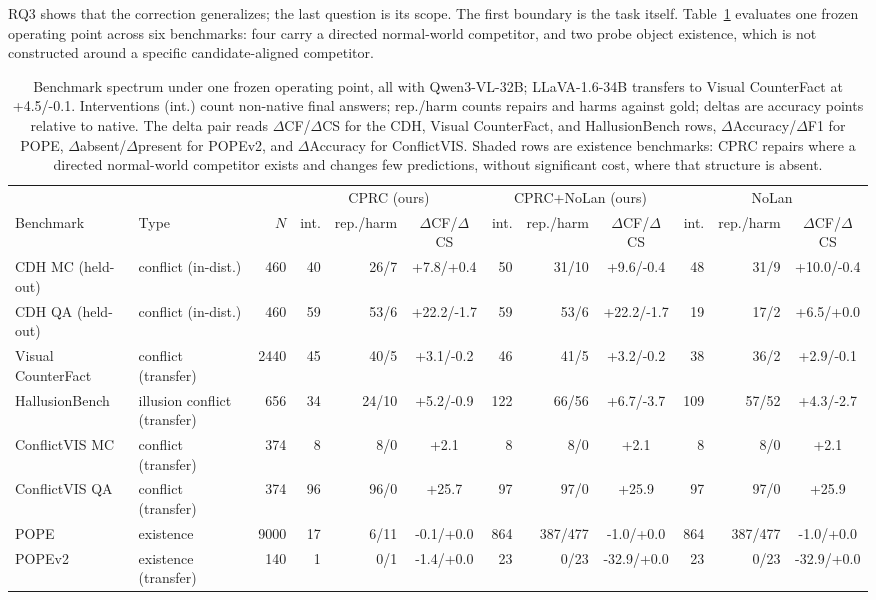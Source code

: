 \documentclass[letterpaper]{article}
\newcommand{\shadedrow}{\rlap{\color{gray!18}\rule[-3pt]{\dimexpr\textwidth\relax}{10pt}}}
\begin{document}
RQ3 shows that the correction generalizes; the last question is its scope.
The first boundary is the task itself. Table~\ref{tab:spectrum} evaluates one
frozen operating point across six benchmarks: four carry a directed
normal-world competitor, and two probe object existence, which is not
constructed around a specific candidate-aligned competitor.

\begin{table}[t]
\centering
\footnotesize
\setlength{\tabcolsep}{2.0pt}
{\scriptsize
\begin{tabular*}{\textwidth}{@{\extracolsep{\fill}}llr rr c rr c rr c@{}}
\toprule
 & & & \multicolumn{3}{c}{CPRC (ours)} & \multicolumn{3}{c}{CPRC+NoLan (ours)} & \multicolumn{3}{c}{NoLan} \\
\cmidrule(lr){4-6} \cmidrule(lr){7-9} \cmidrule(lr){10-12}
Benchmark & Type & $N$ & int. & rep./harm & $\Delta$CF/$\Delta$CS & int. & rep./harm & $\Delta$CF/$\Delta$CS & int. & rep./harm & $\Delta$CF/$\Delta$CS \\
\midrule
CDH MC (held-out) & conflict (in-dist.) & 460 & 40 & 26/7 & +7.8/+0.4 & 50 & 31/10 & +9.6/-0.4 & 48 & 31/9 & +10.0/-0.4 \\
CDH QA (held-out) & conflict (in-dist.) & 460 & 59 & 53/6 & +22.2/-1.7 & 59 & 53/6 & +22.2/-1.7 & 19 & 17/2 & +6.5/+0.0 \\
Visual CounterFact & conflict (transfer) & 2440 & 45 & 40/5 & +3.1/-0.2 & 46 & 41/5 & +3.2/-0.2 & 38 & 36/2 & +2.9/-0.1 \\
HallusionBench & illusion conflict (transfer) & 656 & 34 & 24/10 & +5.2/-0.9 & 122 & 66/56 & +6.7/-3.7 & 109 & 57/52 & +4.3/-2.7 \\
ConflictVIS MC & conflict (transfer) & 374 & 8 & 8/0 & +2.1 & 8 & 8/0 & +2.1 & 8 & 8/0 & +2.1 \\
ConflictVIS QA & conflict (transfer) & 374 & 96 & 96/0 & +25.7 & 97 & 97/0 & +25.9 & 97 & 97/0 & +25.9 \\
\shadedrow POPE & existence & 9000 & 17 & 6/11 & -0.1/+0.0 & 864 & 387/477 & -1.0/+0.0 & 864 & 387/477 & -1.0/+0.0 \\
\shadedrow POPEv2 & existence (transfer) & 140 & 1 & 0/1 & -1.4/+0.0 & 23 & 0/23 & -32.9/+0.0 & 23 & 0/23 & -32.9/+0.0 \\
\bottomrule
\end{tabular*}}
\caption{Benchmark spectrum under one frozen operating point, all with
Qwen3-VL-32B; LLaVA-1.6-34B transfers to Visual CounterFact
at +4.5/-0.1. Interventions (int.) count
non-native final answers; rep./harm counts repairs and harms against gold;
deltas are accuracy points relative to native. The delta pair reads
$\Delta$CF/$\Delta$CS for the CDH, Visual CounterFact, and HallusionBench
rows, $\Delta$Accuracy/$\Delta$F1 for POPE, $\Delta$absent/$\Delta$present
for POPEv2, and $\Delta$Accuracy for ConflictVIS. Shaded rows are existence benchmarks: CPRC repairs
where a directed normal-world competitor exists and changes few
predictions, without significant cost, where that structure is absent.}
\label{tab:spectrum}
\end{table}
\end{document}
